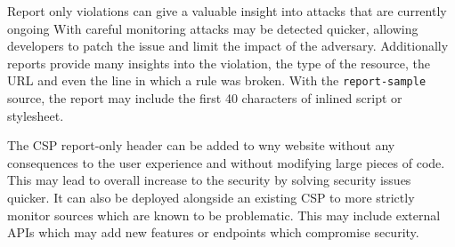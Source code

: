 \documentclass[11]{article}   %
\begin{document}

Report only violations can give a valuable insight into attacks that are currently ongoing 
With careful monitoring attacks may be detected quicker, allowing developers to patch the issue and limit the impact of the adversary.
Additionally reports provide many insights into the violation, the type of the resource, the URL and even the line in which a rule was broken.
With the \texttt{report-sample} source, the report may include the first 40 characters of inlined script or stylesheet.

The CSP report-only header can be added to wny website without any consequences to the user experience and without modifying large pieces of code.
This may lead to overall increase to the security by solving security issues quicker.
It can also be deployed alongside an existing CSP to more strictly monitor sources which are known to be problematic.
This may include external APIs which may add new features or endpoints which compromise security.
\end{document}
